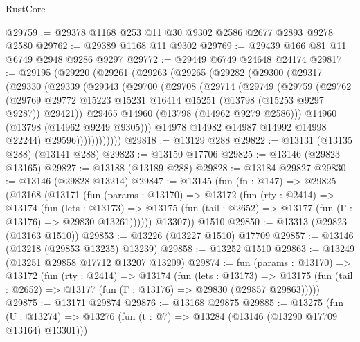 \begin{lexlean}{RustCore}
\begin{coremodule}
@29759 := @29378 @1168 @253 @11 @30 @9302 @2586 @2677 @2893 @9278 @2580
@29762 := @29389 @1168 @11 @9302
@29769 := @29439 @166 @81 @11 @6749 @2948 @9286 @9297
@29772 := @29449 @6749 @24648 @24174
@29817 := @29195
    (@29220
      (@29261
        (@29263
          (@29265
            (@29282
              (@29300
                (@29317
                  (@29330
                    (@29339
                      (@29343
                        (@29700
                          (@29708
                            (@29714
                              (@29749
                                (@29759
                                  (@29762
                                    (@29769
                                      @29772
                                      @15223
                                      @15231
                                      @16414
                                      @15251
                                      (@13798 (@15253 @9297 @9287))
                                      @29421))
                                  @29465
                                  @14960
                                  (@13798 (@14962 @9279 @2586)))
                                @14960
                                (@13798 (@14962 @9249 @9305)))
                              @14978
                              @14982
                              @14987
                              @14992
                              @14998
                              @22244)
                            @29596))))))))))))
@29818 := @13129 @288
@29822 := @13131 (@13135 @288) (@13141 @288)
@29823 := @13150 @17706
@29825 := @13146 (@29823 @13165)
@29827 := @13188 (@13189 @288)
@29828 := @13184 @29827
@29830 := @13146 (@29828 @13214)
@29847 := @13145
    (fun (fn : @147) =>
    @29825
      (@13168
        (@13171
          (fun (params : @13170) =>
          @13172
            (fun (rty : @2414) =>
            @13174
              (fun (lets : @13173) =>
              @13175 (fun (tail : @2652) => @13177 (fun (Γ : @13176) => @29830 @13261))))))
        @13307))
    @1510
@29850 := @13313 (@29823 (@13163 @1510))
@29853 := @13226 (@13227 @1510) @17709
@29857 := @13146 (@13218 (@29853 @13235) @13239)
@29858 := @13252 @1510
@29863 := @13249 (@13251 @29858 @17712 @13207 @13209)
@29874 := fun (params : @13170) =>
  @13172
    (fun (rty : @2414) =>
    @13174
      (fun (lets : @13173) =>
      @13175 (fun (tail : @2652) => @13177 (fun (Γ : @13176) => @29830 (@29857 @29863)))))
@29875 := @13171 @29874
@29876 := @13168 @29875
@29885 := @13275
    (fun (U : @13274) => @13276 (fun (t : @7) => @13284 (@13146 (@13290 @17709 @13164) @13301)))

\end{coremodule}
\end{lexlean}
